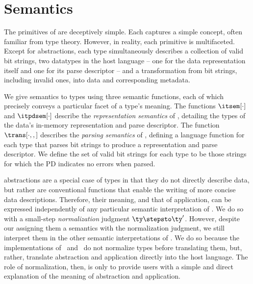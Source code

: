 \section{\ddc{} Semantics}
\label{sec:ddc-sem}

The primitives of \ddc{} are deceptively simple.  Each captures a
simple concept, often familiar from type theory. However, in reality,
each primitive is multifaceted. Except for abstractions, each type
simultaneously describes a collection of valid bit strings, two
datatypes in the host language -- one for the data representation
itself and one for its parse descriptor -- and a transformation from
bit strings, including invalid ones, into data and corresponding
metadata.

We give semantics to \ddc{} types using three semantic functions, each
of which precisely conveys a particular facet of a type's meaning.
The functions $\itsem[\cdot]$ and $\itpdsem[\cdot]$ describe the {\it
  representation semantics} of \ddc{}, detailing the types of the
data's in-memory representation and parse descriptor. The function
$\trans[\cdot,,]$ describes the {\it parsing semantics} of \ddc{},
defining a \implang{} language function for each type that parses bit
strings to produce a representation and parse descriptor. We define
the set of valid bit strings for each type to be those strings for
which the PD indicates no errors when parsed.

\ddc{} abstractions are a special case of \ddc{} types in that they do
not directly describe data, but rather are conventional functions that
enable the writing of more concise data descriptions.
Therefore, their meaning, and that of application, can be expressed
independently of any particular semantic interpretation of \ddc{}. We
do so with a small-step \textit{normalization} judgment $\ty \stepsto
\ty'$.  
However, despite our assigning them a semantics with the normalization
judgment, we still interpret them in the other semantic
interpretations of \ddc.  We do so because the implementations of
\padsc\ and \padsml\ do not normalize types before translating them,
but, rather, translate abstraction and application directly into the
host language. The role of normalization, then, is only to provide
users with a simple and direct explanation of the meaning of
abstraction and application.

